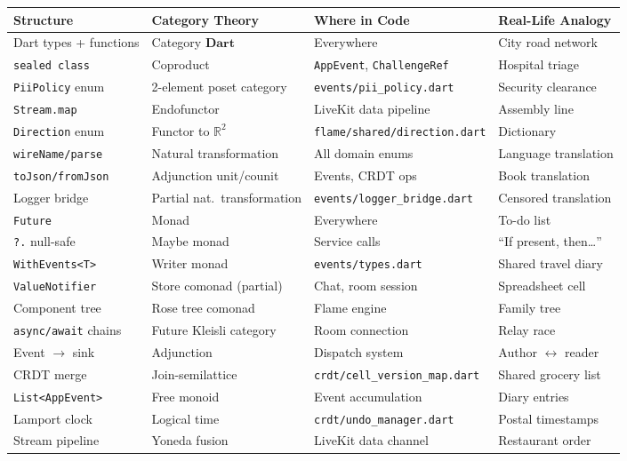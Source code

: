 \documentclass[12pt,a4paper]{article}
\theoremstyle{definition}
\theoremstyle{plain}
\theoremstyle{remark}
\begin{document}
\begin{center}
\small
\begin{tabular}{@{}llll@{}}
\toprule
\textbf{Structure} & \textbf{Category Theory} & \textbf{Where in Code} & \textbf{Real-Life Analogy} \\
\midrule
Dart types + functions & Category $\mathbf{Dart}$ & Everywhere & City road network \\
\texttt{sealed class} & Coproduct & \texttt{AppEvent}, \texttt{ChallengeRef} & Hospital triage \\
\texttt{PiiPolicy} enum & 2-element poset category & \texttt{events/pii\_policy.dart} & Security clearance \\
\texttt{Stream.map} & Endofunctor & LiveKit data pipeline & Assembly line \\
\texttt{Direction} enum & Functor to $\mathbb{R}^2$ & \texttt{flame/shared/direction.dart} & Dictionary \\
\texttt{wireName/parse} & Natural transformation & All domain enums & Language translation \\
\texttt{toJson/fromJson} & Adjunction unit/counit & Events, CRDT ops & Book translation \\
Logger bridge & Partial nat.\ transformation & \texttt{events/logger\_bridge.dart} & Censored translation \\
\texttt{Future} & Monad & Everywhere & To-do list \\
\texttt{?.} null-safe & Maybe monad & Service calls & ``If present, then\ldots'' \\
\texttt{WithEvents<T>} & Writer monad & \texttt{events/types.dart} & Shared travel diary \\
\texttt{ValueNotifier} & Store comonad (partial) & Chat, room session & Spreadsheet cell \\
Component tree & Rose tree comonad & Flame engine & Family tree \\
\texttt{async/await} chains & Future Kleisli category & Room connection & Relay race \\
Event $\to$ sink & Adjunction & Dispatch system & Author $\leftrightarrow$ reader \\
CRDT merge & Join-semilattice & \texttt{crdt/cell\_version\_map.dart} & Shared grocery list \\
\texttt{List<AppEvent>} & Free monoid & Event accumulation & Diary entries \\
Lamport clock & Logical time & \texttt{crdt/undo\_manager.dart} & Postal timestamps \\
Stream pipeline & Yoneda fusion & LiveKit data channel & Restaurant order \\
\bottomrule
\end{tabular}
\end{center}
\end{document}
